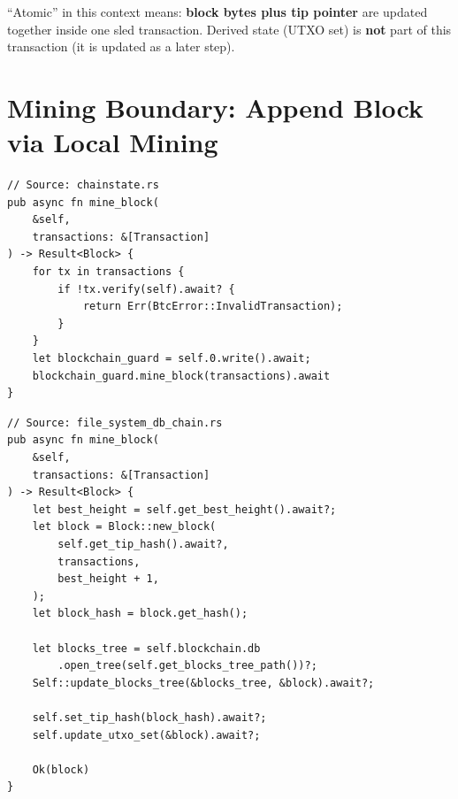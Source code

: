 \begin{notebox}
``Atomic'' in this context means: \textbf{block bytes plus tip pointer} are updated together inside one sled transaction. Derived state (UTXO set) is \textbf{not} part of this transaction (it is updated as a later step).
\end{notebox}

\section{Mining Boundary: Append Block via Local Mining}
\label{sec:ch09-3-mining-append}

\begin{listing}[H]
\caption{Mining: verify before acquiring write lock}
\label{lst:ch09-3-13}
\begin{verbatim}
// Source: chainstate.rs
pub async fn mine_block(
    &self,
    transactions: &[Transaction]
) -> Result<Block> {
    for tx in transactions {
        if !tx.verify(self).await? {
            return Err(BtcError::InvalidTransaction);
        }
    }
    let blockchain_guard = self.0.write().await;
    blockchain_guard.mine_block(transactions).await
}
\end{verbatim}
\end{listing}

\begin{listing}[htbp]
\caption{Persistence engine: create, persist, cache, update UTXO}
\label{lst:ch09-3-14}
\begin{verbatim}
// Source: file_system_db_chain.rs
pub async fn mine_block(
    &self,
    transactions: &[Transaction]
) -> Result<Block> {
    let best_height = self.get_best_height().await?;
    let block = Block::new_block(
        self.get_tip_hash().await?,
        transactions,
        best_height + 1,
    );
    let block_hash = block.get_hash();

    let blocks_tree = self.blockchain.db
        .open_tree(self.get_blocks_tree_path())?;
    Self::update_blocks_tree(&blocks_tree, &block).await?;

    self.set_tip_hash(block_hash).await?;
    self.update_utxo_set(&block).await?;

    Ok(block)
}
\end{verbatim}
\end{listing}

